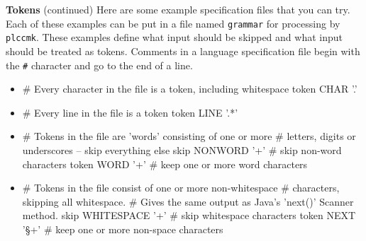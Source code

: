 \begin{minipage}[t]{\sw}
\slidenumber
\LARGE
{\bf Tokens} (continued)\exx
Here are some example specification files that you can try.
Each of these examples can be put in a file named \verb'grammar'
for processing by \verb'plccmk'.
These examples define what input should be skipped
and what input should be treated as tokens.
Comments in a language specification file begin
with the \verb'#' character and go to the end of a line.
\Large
\begin{itemize}
\item
\begin{qv}
# Every character in the file is a token, including whitespace
token CHAR '.'
\end{qv}
\item
\begin{qv}
# Every line in the file is a token
token LINE '.*'
\end{qv}
\item
\begin{qv}
# Tokens in the file are 'words' consisting of one or more
# letters, digits or underscores -- skip everything else
skip NONWORD '\W+'  # skip non-word characters
token WORD '\w+'    # keep one or more word characters
\end{qv}
\item
\begin{qv}
# Tokens in the file consist of one or more non-whitespace
# characters, skipping all whitespace.
# Gives the same output as Java's 'next()' Scanner method.
skip WHITESPACE '\s+'  # skip whitespace characters
token NEXT '\S+'       # keep one or more non-space characters
\end{qv}
\end{itemize}
\Large
\end{minipage}
\clearpage
